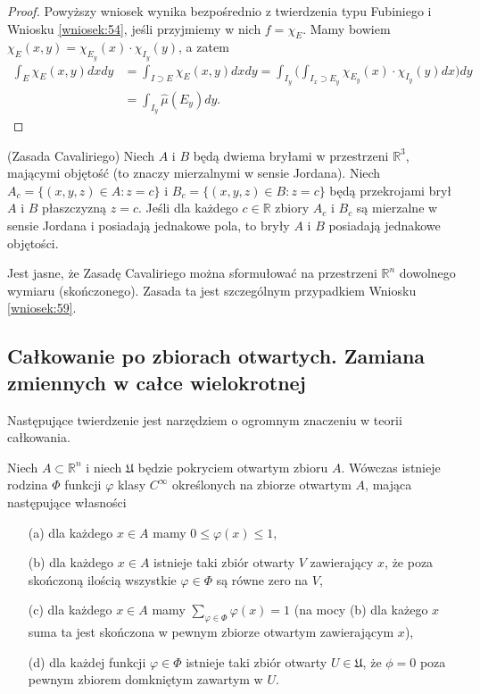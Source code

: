 \documentclass[leqno]{article}
\begin{document}
\begin{justify}
\begin{proof}
    Powyższy wniosek wynika bezpośrednio z twierdzenia typu Fubiniego i Wniosku \ref{wniosek:54}, jeśli przyjmiemy w nich $f = \chi_E$.
    Mamy bowiem $\chi_E(x,y) = \chi_{E_y}(x) \cdot \chi_{I_y}(y)$, a zatem 
    \[
        \begin{aligned}
            \int_{E} \chi_E(x,y)dxdy &= \int_{I \supset E}\chi_E(x,y)dxdy = \int_{I_y}\Big(\int_{I_x \supset E_y} \chi_{E_y}(x) \cdot \chi_{I_y}(y) dx \Big)dy \\
            &= \int_{I_y}\hat{\mu}(E_y)dy.
        \end{aligned}        
    \]
\end{proof}

\begin{wniosek}
{
    (Zasada Cavaliriego) Niech $A$ i $B$ będą dwiema bryłami w przestrzeni $\mathbb{R}^3$, mającymi objętość (to znaczy mierzalnymi w sensie Jordana).
    Niech $A_c = \{(x,y,z) \in A : z = c\}$ i $B_c = \{(x,y,z) \in B : z = c\}$ będą przekrojami brył $A$ i $B$ płaszczyzną $z = c$.
    Jeśli dla każdego $c \in \mathbb{R}$ zbiory $A_c$ i $B_c$ są mierzalne w sensie Jordana i posiadają jednakowe pola, to bryły $A$ i $B$ posiadają jednakowe objętości.
}
\end{wniosek}

Jest jasne, że Zasadę Cavaliriego można sformułować na przestrzeni $\mathbb{R}^n$ dowolnego wymiaru (skończonego). Zasada ta jest szczególnym przypadkiem Wniosku \ref{wniosek:59}.

\subsection{Całkowanie po zbiorach otwartych. Zamiana zmiennych w całce wielokrotnej}

Następujące twierdzenie jest narzędziem o ogromnym znaczeniu w teorii całkowania.

\begin{theorem}
{
    Niech $A \subset \mathbb{R}^n$ i niech $\mathfrak{U}$ będzie pokryciem otwartym zbioru $A$. Wówczas istnieje rodzina $\Phi$ funkcji $\varphi$ klasy $C^\infty$ 
    określonych na zbiorze otwartym $A$, mająca następujące własności
    \begin{itemize}
        \item [(a)] dla każdego $x \in A$ mamy $0 \leqslant \varphi(x) \leqslant 1$,
        \item [(b)] dla każdego $x \in A$ istnieje taki zbiór otwarty $V$ zawierający $x$, że poza skończoną ilością wszystkie $\varphi \in \Phi$ są równe zero na $V$,
        \item [(c)] dla każdego $x \in A$ mamy $\sum_{\varphi \in \Phi}\varphi(x) = 1$ (na mocy (b) dla każego $x$ suma ta jest skończona w pewnym zbiorze otwartym zawierającym $x$),
        \item [(d)] dla każdej funkcji $\varphi \in \Phi$ istnieje taki zbiór otwarty $U \in \mathfrak{U}$, że $\phi = 0$ poza pewnym zbiorem domkniętym zawartym w $U$.
    \end{itemize}
}
\end{theorem}


\end{justify}
\end{document}
